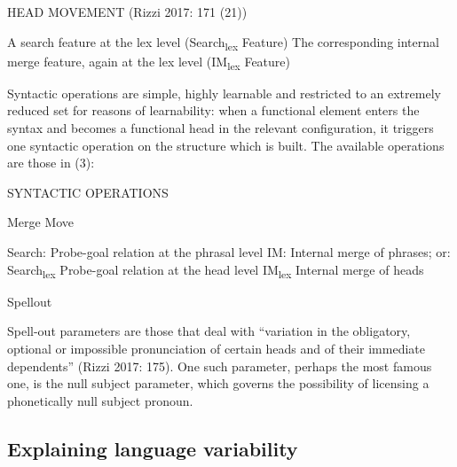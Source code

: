 \documentclass[fleqn,10pt]{wlscirep}
\begin{document}
\begin{exe}
    \ex HEAD MOVEMENT (Rizzi 2017: 171 (21)) 
        \begin{xlist}
            \ex A search feature at the lex level (Search\textsubscript{lex} Feature)
            \ex The corresponding internal merge feature, again at the lex level (IM\textsubscript{lex} Feature)
        \end{xlist}
\end{exe}

Syntactic operations are simple, highly learnable and restricted to an extremely reduced set for reasons of learnability: when a functional element enters the syntax and becomes a functional head in the relevant configuration, it triggers one syntactic operation on the structure which is built. The available operations are those in (3):
	
\begin{exe}
    \ex SYNTACTIC OPERATIONS
        \begin{xlist}
            \ex Merge
            \ex Move
                \begin{xlist}
                    \ex Search:	Probe-goal relation at the phrasal level
                    \ex IM:	Internal merge of phrases; or:
                    \ex Search\textsubscript{lex}	Probe-goal relation at the head level
                    \ex IM\textsubscript{lex}	Internal merge of heads
                \end{xlist}
            \ex Spellout
        \end{xlist}
    \end{exe}

Spell-out parameters are those that deal with “variation in the obligatory, optional or impossible pronunciation of certain heads and of their immediate dependents” (Rizzi 2017: 175). 
One such parameter, perhaps the most famous one, is the null subject parameter, which governs the possibility of licensing a phonetically null subject pronoun.

\subsection*{Explaining language variability}
\end{document}
